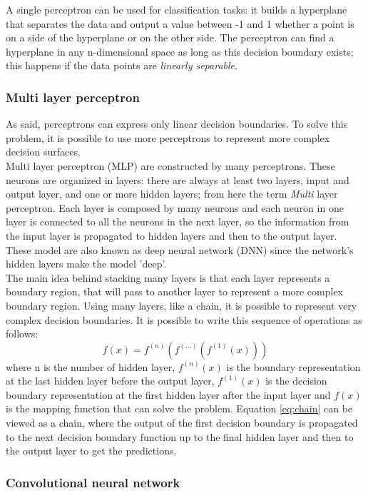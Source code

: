 A single perceptron can be used for classification tasks: it builds a hyperplane that separates the data and output a value between -1 and 1 whether a point is on a side of the hyperplane or on the other side. The perceptron can find a hyperplane in any n-dimensional space as long as this decision boundary exists; this happens if the data points are \emph{linearly separable}.

\subsubsection{Multi layer perceptron}
As said, perceptrons can express only linear decision boundaries. To solve this problem, it is possible to use more perceptrons to represent more complex decision surfaces. \\
Multi layer perceptron (\gls{MLP}) are constructed by many perceptrons. These neurons are organized in layers: there are always at least two layers, input and output layer, and one or more hidden layers; from here the term \emph{Multi} layer perceptron. Each layer is composed by many neurons and each neuron in one layer is connected to all the neurons in the next layer, so the information from the input layer is propagated to hidden layers and then to the output layer. These model are also known as deep neural network (\gls{DNN}) since the  network's hidden layers make the model 'deep'. \\

The main idea behind stacking many layers is that each layer represents a boundary region, that will pass to another layer to represent a more complex boundary region. Using many layers, like a chain, it is possible to represent very complex decision boundaries. It is possible to write this sequence of operations as follows:
\begin{equation}\label{eq:chain}
f(x) = f^{(n)}( f^{(...)}( f^{(1)}(x)) )
\end{equation}
\noindent where n is the number of hidden layer, $f^{(n)}(x)$ is the boundary representation at the last hidden layer before the output layer, $f^{(1)}(x)$ is the decision boundary representation at the first hidden layer after the input layer and $f(x)$ is the mapping function that can solve the problem. Equation \ref{eq:chain} can be viewed as a chain, where the output of the first decision boundary is propagated to the next decision boundary function up to the final hidden layer and then to the output layer to get the predictions.

\subsubsection{Convolutional neural network}
